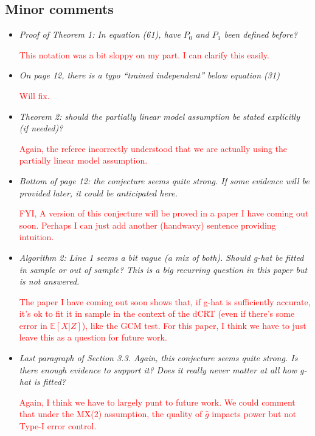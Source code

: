 \documentclass[12pt]{article}
\begin{document}
\subsection{Minor comments}

\begin{itemize}
	\item \textsl{Proof of Theorem 1: In equation (61), have $P_0$ and $P_1$ been defined before?}
	
	\textcolor{red}{This notation was a bit sloppy on my part. I can clarify this easily.}

	\item \textsl{On page 12, there is a typo “trained independent” below equation (31)}
	
	\textcolor{red}{Will fix.}

	\item \textsl{Theorem 2: should the partially linear model assumption be stated explicitly (if needed)?}
	
	\textcolor{red}{Again, the referee incorrectly understood that we are actually using the partially linear model assumption.}

	\item \textsl{Bottom of page 12: the conjecture seems quite strong. If some evidence will be provided later, it could be anticipated here.}
	
	\textcolor{red}{FYI, A version of this conjecture will be proved in a paper I have coming out soon. Perhaps I can just add another (handwavy) sentence providing intuition.}

	
	\item \textsl{Algorithm 2: Line 1 seems a bit vague (a mix of both). Should g-hat be fitted in sample or out of sample? This is a big recurring question in this paper but is not answered.}
	
	\textcolor{red}{The paper I have coming out soon shows that, if g-hat is sufficiently accurate, it's ok to fit it in sample in the context of the dCRT (even if there's some error in $\mathbb E[X|Z]$), like the GCM test. For this paper, I think we have to just leave this as a question for future work.}

	\item \textsl{Last paragraph of Section 3.3. Again, this conjecture seems quite strong. Is there enough evidence to support it? Does it really never matter at all how g-hat is fitted?}
	
	\textcolor{red}{Again, I think we have to largely punt to future work. We could comment that under the MX(2) assumption, the quality of $\widehat g$ impacts power but not Type-I error control.}


\end{itemize}
\end{document}
